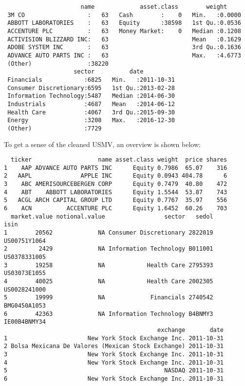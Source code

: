 \documentclass[12pt,twoside]{reedthesis}
\theoremstyle{definition}
\theoremstyle{definition}
\theoremstyle{definition}
\theoremstyle{remark}
\begin{document}
\begin{verbatim}
                      name             asset.class        weight      
 3M CO                  :   63   Cash        :    0   Min.   :0.0000  
 ABBOTT LABORATORIES    :   63   Equity      :38598   1st Qu.:0.0536  
 ACCENTURE PLC          :   63   Money Market:    0   Median :0.1208  
 ACTIVISION BLIZZARD INC:   63                        Mean   :0.1629  
 ADOBE SYSTEM INC       :   63                        3rd Qu.:0.1636  
 ADVANCE AUTO PARTS INC :   63                        Max.   :4.6773  
 (Other)                :38220                                        
                    sector          date           
 Financials            :6825   Min.   :2011-10-31  
 Consumer Discretionary:6595   1st Qu.:2013-02-28  
 Information Technology:5487   Median :2014-06-30  
 Industrials           :4687   Mean   :2014-06-12  
 Health Care           :4067   3rd Qu.:2015-09-30  
 Energy                :3208   Max.   :2016-12-30  
 (Other)               :7729                       
\end{verbatim}
To get a sense of the cleaned USMV, an overview is shown below:
\begin{verbatim}
  ticker                   name asset.class weight  price shares
1    AAP ADVANCE AUTO PARTS INC      Equity 0.7986  65.07    316
2   AAPL              APPLE INC      Equity 0.0943 404.78      6
3    ABC AMERISOURCEBERGEN CORP      Equity 0.7479  40.80    472
4    ABT    ABBOTT LABORATORIES      Equity 1.5544  53.87    743
5   ACGL ARCH CAPITAL GROUP LTD      Equity 0.7767  35.97    556
6    ACN          ACCENTURE PLC      Equity 1.6452  60.26    703
  market.value notional.value                 sector   sedol         isin
1        20562             NA Consumer Discretionary 2822019 US00751Y1064
2         2429             NA Information Technology B011001 US0378331005
3        19258             NA            Health Care 2795393 US03073E1055
4        40025             NA            Health Care 2002305 US0028241000
5        19999             NA             Financials 2740542 BMG0450A1053
6        42363             NA Information Technology B4BNMY3 IE00B4BNMY34
                                            exchange       date
1                       New York Stock Exchange Inc. 2011-10-31
2 Bolsa Mexicana De Valores (Mexican Stock Exchange) 2011-10-31
3                       New York Stock Exchange Inc. 2011-10-31
4                       New York Stock Exchange Inc. 2011-10-31
5                                             NASDAQ 2011-10-31
6                       New York Stock Exchange Inc. 2011-10-31
\end{verbatim}
\end{document}
